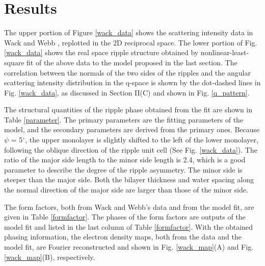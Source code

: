 \section{Results}

The upper portion of Figure \ref{wack_data} shows the scattering
intensity data in Wack and Webb \cite{Wac89a}, replotted in the 2D 
reciprocal space. The lower portion of Fig. \ref{wack_data} shows
the real space ripple structure obtained by nonlinear-least-square 
fit of the above data to the model proposed in the last section. 
The correlation between the normals of the two sides of the ripples 
and the angular scattering intensity distribution in the q-space is shown
by the dot-dashed lines in Fig. \ref{wack_data}, as discussed in 
Section II(C) and shown in Fig. \ref{q_pattern}.

The structural quantities of the ripple phase obtained from the fit
are shown in Table \ref{parameter}. The primary parameters are the
fitting parameters of the model, and the secondary parameters are
derived from the primary ones. Because $\psi$ = 5$^{\circ}$, 
the upper monolayer is slightly shifted to the left of the lower
monolayer, following the oblique direction of the ripple unit
cell (See Fig. \ref{wack_data}). The ratio of the major side length to the 
minor side length is 2.4, which is a good parameter 
to describe the degree of the ripple asymmetry. The minor side
is steeper than the major side. Both the bilayer thickness and water spacing 
along the normal direction of the major side are larger than those of 
the minor side.

The form factors, both from Wack and Webb's data \cite{Wac89a} and
from the model fit, are given in Table \ref{formfactor}. The phases
of the form factors are outputs of the model fit and listed
in the last column of Table \ref{formfactor}. 
With the obtained phasing information, the electron density maps, both from 
the data and the model fit, are Fourier reconstructed and shown in 
Fig. \ref{wack_map}(A) and Fig. \ref{wack_map}(B), respectively.

